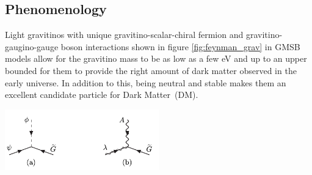 {\subsection{Phenomenology}
Light gravitinos with unique gravitino-scalar-chiral fermion and gravitino-gaugino-gauge boson interactions shown in figure \ref{fig:feynman_grav} in GMSB models allow for the gravitino mass to be as low as a few eV and up to an upper bounded for them to
provide the right amount of dark matter observed in the early universe. In addition to this, being neutral and stable makes them an excellent candidate particle for Dark Matter~(DM).
\begin{center}
\centering
\mbox{\includegraphics[height=0.3\textwidth, width=0.5\textwidth]{THESISPLOTS/Gravitino-GauginoCoupling.png}} 
\label{fig:feynman_grav}
\end{center}
}
